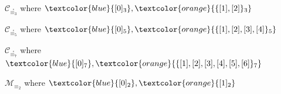 \documentclass[10pt,serif, professionalfont]{beamer}
\begin{document}
\begin{frame}{$\mathcal{C}_{\stackrel{\circ}{\equiv_{3}}}$ where 
    $\textcolor{blue}{[0]_{3}},\textcolor{orange}{\lbrace [1],[2] \rbrace_{3}}$}

    
\end{frame}
\begin{frame}{$\mathcal{C}_{\stackrel{\circ}{\equiv_{5}}}$ where 
    $\textcolor{blue}{[0]_{5}},\textcolor{orange}{\lbrace [1],[2],[3],[4] \rbrace_{5}}$}

    
\end{frame}
\begin{frame}{$\mathcal{C}_{\stackrel{\circ}{\equiv_{7}}}$ where 
    $\textcolor{blue}{[0]_{7}},\textcolor{orange}{\lbrace [1],[2],[3],[4],[5],[6] \rbrace_{7}}$}

    
\end{frame}


\begin{frame}{$\mathcal{M}_{\equiv_{2}}$ where 
    $\textcolor{blue}{[0]_{2}},\textcolor{orange}{[1]_{2}}$}

    
\end{frame}
\end{document}
